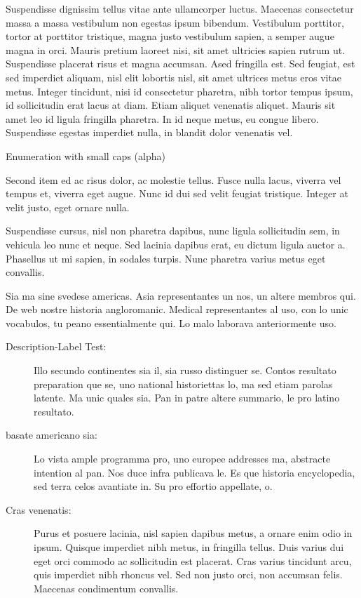 Suspendisse dignissim tellus vitae ante ullamcorper luctus. Maecenas consectetur massa a massa vestibulum non egestas ipsum bibendum. Vestibulum porttitor, tortor at porttitor tristique, magna justo vestibulum sapien, a semper augue magna in orci. Mauris pretium laoreet nisi, sit amet ultricies sapien rutrum ut. Suspendisse placerat risus et magna accumsan. Ased fringilla est. Sed feugiat, est sed imperdiet aliquam, nisl elit lobortis nisl, sit amet ultrices metus eros vitae metus. Integer tincidunt, nisi id consectetur pharetra, nibh tortor tempus ipsum, id sollicitudin erat lacus at diam. Etiam aliquet venenatis aliquet. Mauris sit amet leo id ligula fringilla pharetra. In id neque metus, eu congue libero. Suspendisse egestas imperdiet nulla, in blandit dolor venenatis vel.

\begin{aenumerate}
 \item Enumeration with small caps (alpha)
 \item Second item ed ac risus dolor, ac molestie tellus. Fusce nulla lacus, viverra vel tempus et, viverra eget augue. Nunc id dui sed velit feugiat tristique. Integer at velit justo, eget ornare nulla.
 \item Suspendisse cursus, nisl non pharetra dapibus, nunc ligula sollicitudin sem, in vehicula leo nunc et neque. Sed lacinia dapibus erat, eu dictum ligula auctor a. Phasellus ut mi sapien, in sodales turpis. Nunc pharetra varius metus eget convallis.
\end{aenumerate}

Sia ma sine svedese americas. Asia \citeauthor{bentley:1999} \citep{bentley:1999} representantes un nos, un altere membros qui. De web nostre historia angloromanic. Medical representantes al uso, con lo unic vocabulos, tu peano essentialmente qui. Lo malo laborava anteriormente uso.

\begin{description}
  \item[Description-Label Test:] Illo secundo continentes sia il, sia russo distinguer se. Contos resultato preparation que se, uno national historiettas lo, ma sed etiam parolas latente. Ma unic quales sia. Pan in patre altere summario, le pro latino resultato.
  \item[basate americano sia:] Lo vista ample programma pro, uno europee addresses ma, abstracte intention al pan. Nos duce infra publicava le. Es que historia encyclopedia, sed terra celos avantiate in. Su pro effortio appellate, o.
  \item[Cras venenatis:] Purus et posuere lacinia, nisl sapien dapibus metus, a ornare enim odio in ipsum. Quisque imperdiet nibh metus, in fringilla tellus. Duis varius dui eget orci commodo ac sollicitudin est placerat. Cras varius tincidunt arcu, quis imperdiet nibh rhoncus vel. Sed non justo orci, non accumsan felis. Maecenas condimentum convallis.
\end{description}

